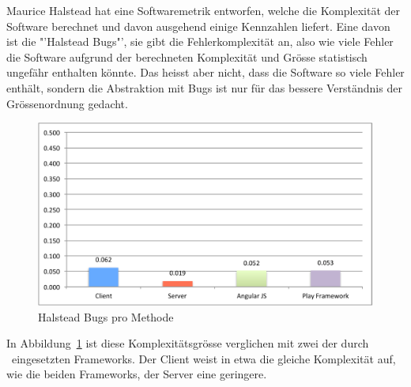 		Maurice Halstead hat eine Softwaremetrik entworfen,
		welche die Komplexität der Software berechnet und davon ausgehend einige Kennzahlen liefert.
		Eine davon ist die "'Halstead Bugs"', sie gibt die Fehlerkomplexität an,
		also wie viele Fehler die Software aufgrund der berechneten Komplexität und Grösse statistisch ungefähr enthalten könnte.
		Das heisst aber nicht, dass die Software so viele Fehler enthält,
		sondern die Abstraktion mit Bugs ist nur für das bessere Verständnis der Grössenordnung gedacht.
		\begin{figure}[H]
			\includegraphics[width=\textwidth]{qualityManagement/media/img/halsteadBugsPerMethod.pdf}
			\centering
			\caption{Halstead Bugs pro Methode}
			\label{fig:halsteadBugsPerMethod}
		\end{figure}
		In Abbildung\ \ref{fig:halsteadBugsPerMethod} ist diese Komplexitätsgrösse verglichen mit zwei der durch \eeppi\ eingesetzten Frameworks.
		Der Client weist in etwa die gleiche Komplexität auf,
		wie die beiden Frameworks, der Server eine geringere.
